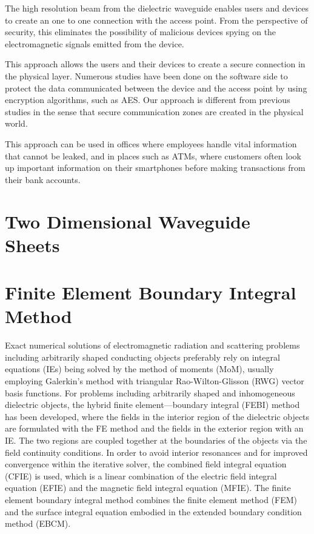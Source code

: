 \documentclass[a4paper,12pt]{report}
\begin{document}
The high resolution beam from the dielectric waveguide
enables users and devices to create an one to one
connection with the access point.
From the perspective of security, this eliminates the possibility of
malicious devices spying on the electromagnetic signals emitted from the device.

This approach allows the users and their devices to create a
secure connection in the physical layer.
Numerous studies have been done on the software side to protect the
data communicated between the device and the access point by using
encryption algorithms, such as AES.
Our approach is different from previous studies
in the sense that secure communication zones are created in the physical world.

This approach can be used in offices where employees handle
vital information that cannot be leaked, and in places such as ATMs,
where customers often look up important information on their
smartphones before making transactions from their bank accounts.

\section{Two Dimensional Waveguide Sheets}

\section{Finite Element Boundary Integral Method}

Exact numerical solutions of electromagnetic radiation
and scattering problems including arbitrarily shaped conducting objects preferably rely on integral equations (IEs) being
solved by the method of moments (MoM), usually employing
Galerkin's method with triangular Rao-Wilton-Glisson (RWG)
vector basis functions.
For problems including arbitrarily shaped and inhomogeneous dielectric
objects, the hybrid finite element—boundary integral (FEBI)
method has been developed, where the fields in the
interior region of the dielectric objects are formulated with the
FE method and the fields in the exterior region with an IE.
The two regions are coupled together at the boundaries of the
objects via the field continuity conditions. In order to avoid
interior resonances and for improved convergence within the
iterative solver, the combined field integral equation (CFIE) is
used, which is a linear combination of the electric field integral equation (EFIE) and the magnetic field integral equation
(MFIE).
The finite element boundary integral method
combines the finite element
method (FEM) and the surface integral equation
embodied in the extended boundary condition
method (EBCM).
\end{document}
